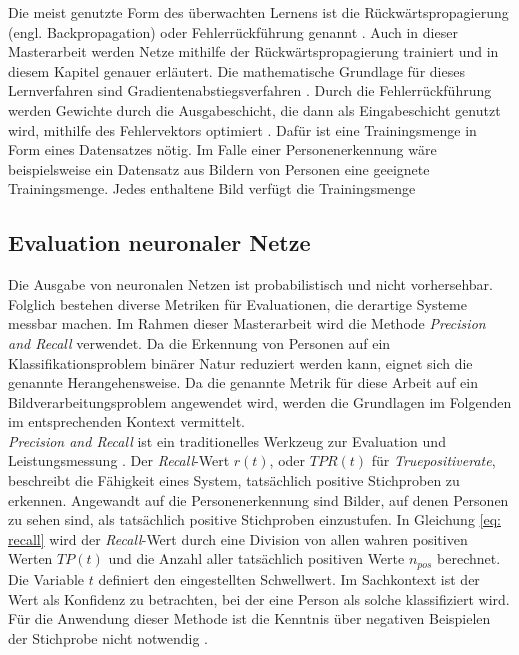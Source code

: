 		Die meist genutzte Form des überwachten Lernens ist die Rückwärtspropagierung (engl. Backpropagation) oder Fehlerrückführung genannt \cite{Ertel}. Auch in dieser Masterarbeit werden Netze mithilfe der Rückwärtspropagierung trainiert und in diesem Kapitel genauer erläutert. Die mathematische Grundlage für dieses Lernverfahren sind Gradientenabstiegsverfahren \cite{Kriesel}. Durch die Fehlerrückführung werden Gewichte durch die Ausgabeschicht, die dann als Eingabeschicht genutzt wird, mithilfe des Fehlervektors optimiert \cite{Kriesel}. Dafür ist eine Trainingsmenge in Form eines Datensatzes nötig. Im Falle einer Personenerkennung wäre beispielsweise ein Datensatz aus Bildern von Personen eine geeignete Trainingsmenge. Jedes enthaltene Bild verfügt die Trainingsmenge\\
		
	
		
		\subsection{Evaluation neuronaler Netze}
			
		Die Ausgabe von neuronalen Netzen ist probabilistisch und nicht vorhersehbar. Folglich bestehen diverse Metriken für Evaluationen, die derartige Systeme messbar machen. Im Rahmen dieser Masterarbeit wird die Methode \textit{Precision and Recall} verwendet. Da die Erkennung von Personen auf ein Klassifikationsproblem binärer Natur reduziert werden kann, eignet sich die genannte Herangehensweise. Da die genannte Metrik für diese Arbeit auf ein Bildverarbeitungsproblem angewendet wird, werden die Grundlagen im Folgenden im entsprechenden Kontext vermittelt.\\
		
		\textit{Precision and Recall} ist ein traditionelles Werkzeug zur Evaluation und Leistungsmessung \cite{precisionandrecall}. Der \textit{Recall}-Wert $r(t)$, oder $TPR(t)$ für \textit{Truepositiverate}, beschreibt die Fähigkeit eines System, tatsächlich positive Stichproben zu erkennen. Angewandt auf die Personenerkennung sind Bilder, auf denen Personen zu sehen sind, als tatsächlich positive Stichproben einzustufen. In Gleichung \ref{eq: recall} wird der \textit{Recall}-Wert durch eine Division von allen wahren positiven Werten $TP(t)$ und die Anzahl aller tatsächlich positiven Werte $n_{pos}$ berechnet. Die Variable $t$ definiert den eingestellten Schwellwert. Im Sachkontext ist der Wert als Konfidenz zu betrachten, bei der eine Person als solche klassifiziert wird. Für die Anwendung dieser Methode ist die Kenntnis über negativen Beispielen der Stichprobe nicht notwendig \cite{bildundobjekt}.\\ 
		
